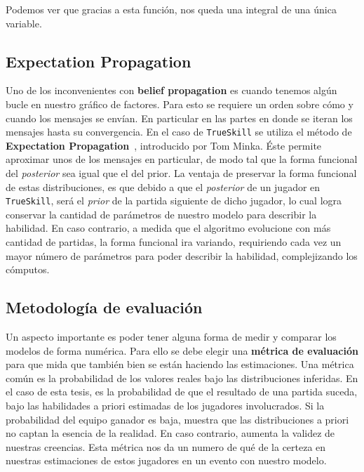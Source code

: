 \documentclass[11pt,twoside, spanish]{report} %
\begin{document}
Podemos ver que gracias a esta funci\'on, nos queda una integral de una \'unica variable.


\subsection{Expectation Propagation}
Uno de los inconvenientes con \textbf{belief propagation} es cuando tenemos alg\'un bucle en nuestro gr\'afico de factores.
Para esto se requiere un orden sobre c\'omo y cuando los mensajes se env\'ian.
En particular en las partes en donde se iteran los mensajes hasta su convergencia.
En el caso de \texttt{TrueSkill} se utiliza el m\'etodo de \textbf{Expectation Propagation}~\cite{herbrich2005}, introducido por Tom Minka.
\'Este permite aproximar unos de los mensajes en particular, de modo tal que  la forma funcional del \textit{posterior} sea igual que el del prior.
La ventaja de preservar la forma funcional de estas distribuciones, es que debido a que el \textit{posterior} de un jugador en \texttt{TrueSkill},  ser\'a el \textit{prior} de la partida siguiente de dicho jugador, lo cual logra conservar la cantidad de par\'ametros de nuestro modelo para describir la habilidad.
En caso contrario, a medida que el algoritmo evolucione con m\'as cantidad de partidas, la forma funcional ira variando, requiriendo cada vez un mayor n\'umero de par\'ametros para poder describir la habilidad, complejizando los c\'omputos.






\subsection{Metodolog\'ia de evaluaci\'on}

Un aspecto importante es poder tener alguna forma de medir y comparar los modelos de forma num\'erica.
Para ello se debe elegir una \textbf{m\'etrica de evaluaci\'on} para que mida que tambi\'en bien se est\'an haciendo las estimaciones.
Una m\'etrica com\'un es la probabilidad de los valores reales bajo las distribuciones inferidas.
En el caso de esta tesis, es la probabilidad de que el resultado de una partida suceda, bajo las habilidades a priori estimadas de los jugadores involucrados.
Si la probabilidad del equipo ganador es baja, muestra que las distribuciones a priori no captan la esencia de la realidad.
En caso contrario, aumenta la validez de nuestras creencias.
Esta m\'etrica nos da un numero de qu\'e de la certeza en nuestras estimaciones de estos jugadores en un evento con nuestro modelo.
\end{document}
